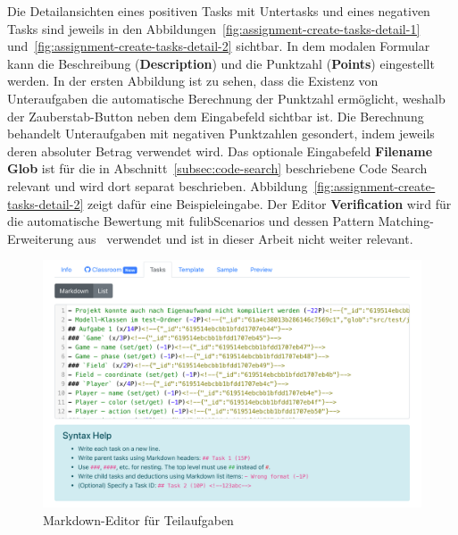 Die Detailansichten eines positiven Tasks mit Untertasks und eines negativen Tasks sind jeweils in den Abbildungen~\ref{fig:assignment-create-tasks-detail-1} und~\ref{fig:assignment-create-tasks-detail-2} sichtbar.
In dem modalen Formular kann die Beschreibung (\textbf{Description}) und die Punktzahl (\textbf{Points}) eingestellt werden.
In der ersten Abbildung ist zu sehen, dass die Existenz von Unteraufgaben die automatische Berechnung der Punktzahl ermöglicht, weshalb der Zauberstab-Button neben dem Eingabefeld sichtbar ist.
Die Berechnung behandelt Unteraufgaben mit negativen Punktzahlen gesondert, indem jeweils deren absoluter Betrag verwendet wird.
Das optionale Eingabefeld \textbf{Filename Glob} ist für die in Abschnitt~\ref{subsec:code-search} beschriebene Code Search relevant und wird dort separat beschrieben.
Abbildung~\ref{fig:assignment-create-tasks-detail-2} zeigt dafür eine Beispieleingabe.
Der Editor \textbf{Verification} wird für die automatische Bewertung mit fulibScenarios und dessen Pattern Matching-Erweiterung aus~\cite{bachelor-thesis} verwendet und ist in dieser Arbeit nicht weiter relevant.

\begin{figure}
    \centering
    \includegraphics[width=\textwidth]{images/assignment-create-tasks-markdown}
    \caption{Markdown-Editor für Teilaufgaben}
    \label{fig:assignment-create-tasks-markdown}
\end{figure}

